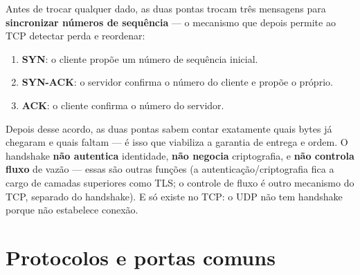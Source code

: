 \begin{conceito}
Antes de trocar qualquer dado, as duas pontas trocam três mensagens para
\textbf{sincronizar números de sequência} --- o mecanismo que depois
permite ao TCP detectar perda e reordenar:
\begin{enumerate}
\item \textbf{SYN}: o cliente propõe um número de sequência inicial.
\item \textbf{SYN-ACK}: o servidor confirma o número do cliente e propõe o
próprio.
\item \textbf{ACK}: o cliente confirma o número do servidor.
\end{enumerate}
Depois desse acordo, as duas pontas sabem contar exatamente quais bytes já
chegaram e quais faltam --- é isso que viabiliza a garantia de entrega e
ordem. O handshake \textbf{não autentica} identidade, \textbf{não negocia}
criptografia, e \textbf{não controla fluxo} de vazão --- essas são outras
funções (a autenticação/criptografia fica a cargo de camadas superiores
como TLS; o controle de fluxo é outro mecanismo do TCP, separado do
handshake). E só existe no TCP: o UDP não tem handshake porque não
estabelece conexão.
\end{conceito}

\section{Protocolos e portas comuns}

